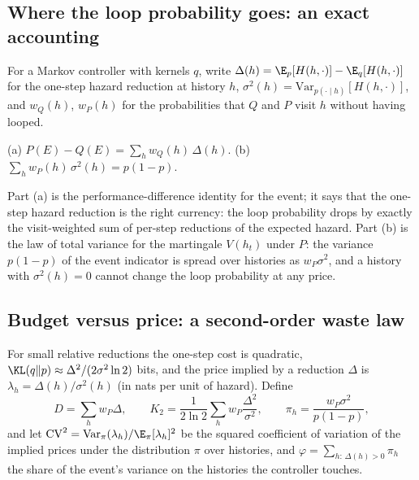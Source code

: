 \subsection{Where the loop probability goes: an exact accounting}\label{ssec:accounting}
For a Markov controller with kernels $q$, write $\Delta(h)=\E_{p}[H(h,\cdot)]-\E_{q}[H(h,\cdot)]$ for the one-step hazard reduction at history $h$, $\sigma^2(h)=\mathrm{Var}_{p(\cdot\mid h)}[H(h,\cdot)]$, and $w_Q(h)$, $w_P(h)$ for the probabilities that $Q$ and $P$ visit $h$ without having looped.

\begin{prop}\label{prop:accounting}
(a) $P(E)-Q(E)=\sum_h w_Q(h)\,\Delta(h)$. (b) $\sum_h w_P(h)\,\sigma^2(h)=p(1-p)$.
\end{prop}
Part (a) is the performance-difference identity \cite{kakade2002approximately} for the event; it says that the one-step hazard reduction is the right currency: the loop probability drops by exactly the visit-weighted sum of per-step reductions of the expected hazard. Part (b) is the law of total variance for the martingale $V(h_t)$ under $P$: the variance $p(1-p)$ of the event indicator is spread over histories as $w_P\sigma^2$, and a history with $\sigma^2(h)=0$ cannot change the loop probability at any price.

\subsection{Budget versus price: a second-order waste law}\label{ssec:wastelaw}
For small relative reductions the one-step cost is quadratic, $\KL(q\Vert p)\approx \Delta^2/(2\sigma^2\ln 2)$ bits, and the price implied by a reduction $\Delta$ is $\lambda_h=\Delta(h)/\sigma^2(h)$ (in nats per unit of hazard). Define
\[
D=\sum_h w_P\Delta,\qquad K_2=\frac1{2\ln2}\sum_h w_P\frac{\Delta^2}{\sigma^2},\qquad \pi_h=\frac{w_P\sigma^2}{p(1-p)},
\]
and let $\mathrm{CV}^2=\mathrm{Var}_\pi(\lambda_h)/\E_\pi[\lambda_h]^2$ be the squared coefficient of variation of the implied prices under the distribution $\pi$ over histories, and $\varphi=\sum_{h:\,\Delta(h)>0}\pi_h$ the share of the event's variance on the histories the controller touches.

